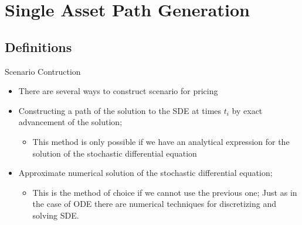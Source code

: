 \documentclass[11pt]{beamer}
\begin{document}
\section{Single Asset Path Generation}
\subsection{Definitions}

\begin{frame}{Scenario Contruction}
\begin{itemize}
\item There are several ways to construct scenario for pricing
\item Constructing a path of the solution to the SDE at times $t_i$ by exact advancement of the solution; 
\begin{itemize}
\item This method is only possible if we have an analytical expression for the solution of the stochastic differential equation
\end{itemize}
\item Approximate numerical solution of the stochastic differential equation; 
\begin{itemize}
\item This is the method of choice if we cannot use the previous one;
Just as in the case of ODE there are numerical techniques for discretizing and solving SDE.
\end{itemize}

\end{itemize}
\end{frame}
\end{document}
